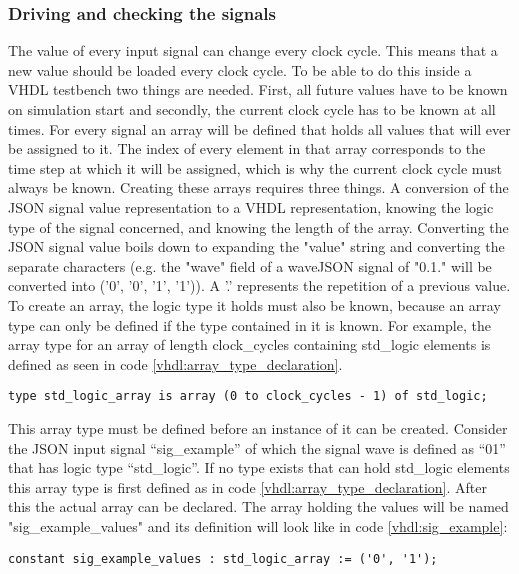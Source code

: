 \subsubsection{Driving and checking the signals}
The value of every input signal can change every clock cycle. This means that a new value should be loaded every clock cycle. To be able to do this inside a VHDL testbench two things are needed. First, all future values have to be known on simulation start and secondly, the current clock cycle has to be known at all times. For every signal an array will be defined that holds all values that will ever be assigned to it. The index of every element in that array corresponds to the time step at which it will be assigned, which is why the current clock cycle must always be known.
\npar
Creating these arrays requires three things. A conversion of the JSON signal value representation to a VHDL representation, knowing the logic type of the signal concerned, and knowing the length of the array.
\npar
Converting the JSON signal value boils down to expanding the "value" string and converting the separate characters (e.g. the "wave" field of a waveJSON signal of "0.1." will be converted into ('0', '0', '1', '1')). A '.' represents the repetition of a previous value.
\npar
To create an array, the logic type it holds must also be known, because an array type can only be defined if the type contained in it is known. For example, the array type for an array of length clock\_cycles containing std\_logic elements is defined as seen in code \ref{vhdl:array_type_declaration}.
\begin{lstlisting}[style=vhdl, caption={Declaration of an std\_logic array type of lenght clock\_cycles}, label={vhdl:array_type_declaration}]
type std_logic_array is array (0 to clock_cycles - 1) of std_logic;
\end{lstlisting}\noindent
This array type must be defined before an instance of it can be created. Consider the JSON input signal “sig\_example” of which the signal wave is defined as “01” that has logic type “std\_logic”. If no type exists that can hold std\_logic elements this array type is first defined as in code \ref{vhdl:array_type_declaration}. After this the actual array can be declared. The array holding the values will be named "sig\_example\_values" and its definition will look like in code \ref{vhdl:sig_example}:
\begin{lstlisting}[style=vhdl, caption={Definition of a std\_logic array}, label={vhdl:sig_example}]
constant sig_example_values : std_logic_array := ('0', '1');
\end{lstlisting}\noindent
